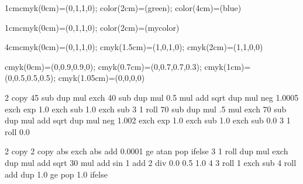 \documentclass{article}
\begin{document}
  {1cm}{cmyk(0cm)=(0,1,1,0); color(2cm)=(green); color(4cm)=(blue)}

  {1cm}{cmyk(0cm)=(0,1,1,0); color(2cm)=(mycolor)}

  {4cm}{cmyk(0cm)=(0,1,1,0); cmyk(1.5cm)=(1,0,1,0); cmyk(2cm)=(1,1,0,0)}

%
  {cmyk(0cm)=(0,0.9,0.9,0);
   cmyk(0.7cm)=(0,0.7,0.7,0.3);
   cmyk(1cm)=(0,0.5,0.5,0.5);
   cmyk(1.05cm)=(0,0,0,0)}

    {\pgfpointorigin}{\pgfpoint{4cm}{4cm}}{}{
  2 copy
  45 sub dup mul exch
  40 sub dup mul 0.5 mul add sqrt
  dup mul neg 1.0005 exch exp 1.0 exch sub
  1.0 exch sub
  3 1 roll
  70 sub dup mul .5 mul exch
  70 sub dup mul add sqrt
  dup mul neg 1.002 exch exp 1.0 exch sub
  1.0 exch sub
  0.0 3 1 roll
  0.0
}

    {\pgfpoint{1cm}{1cm}}{}{
  2 copy       %
  2 copy abs exch abs add 0.0001 ge { atan } { pop } ifelse
  3 1 roll
  dup mul exch
  dup mul add sqrt
  30 mul
  add
  sin
  1 add 2 div
  0.0 0.5 1.0
  4 3 roll
  1 exch sub
   4 roll
  add dup 1.0 ge { pop 1.0 } { } ifelse
}
%
%
%
\end{document}
